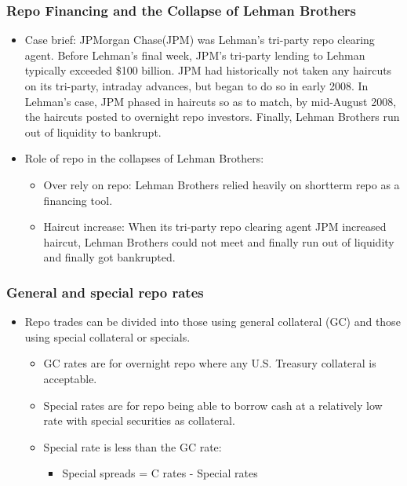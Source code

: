 \subsubsection{Repo Financing and the Collapse of Lehman Brothers}
\begin{itemize}
\item Case brief: JPMorgan Chase(JPM) was Lehman's tri-party repo clearing agent. Before Lehman's final week, JPM's tri-party lending to Lehman typically exceeded \$100 billion. JPM had historically not taken any haircuts on its tri-party, intraday advances, but began to do so in early 2008. In Lehman's case, JPM phased in haircuts so as to match, by mid-August 2008, the haircuts posted to overnight repo investors. Finally, Lehman Brothers run out of liquidity to bankrupt.
\item Role of repo in the collapses of Lehman Brothers:
    \begin{itemize}
    \item Over rely on repo: Lehman Brothers relied heavily on shortterm repo as a financing tool.
    \item Haircut increase: When its tri-party repo clearing agent JPM increased haircut, Lehman Brothers could not meet and finally run out of liquidity and finally got bankrupted.
    \end{itemize}
\end{itemize}




\subsubsection{General and special repo rates}
\begin{itemize}
\item Repo trades can be divided into those using general collateral (GC) and those using special collateral or specials.
    \begin{itemize}
    \item GC rates are for overnight repo where any U.S. Treasury collateral is acceptable.
    \item Special rates are for repo being able to borrow cash at a relatively low rate with special securities as collateral.
    \item Special rate is less than the GC rate:
        \begin{itemize}
        \item Special spreads = C rates - Special rates
        \end{itemize}
    \end{itemize}
    
\end{itemize}




